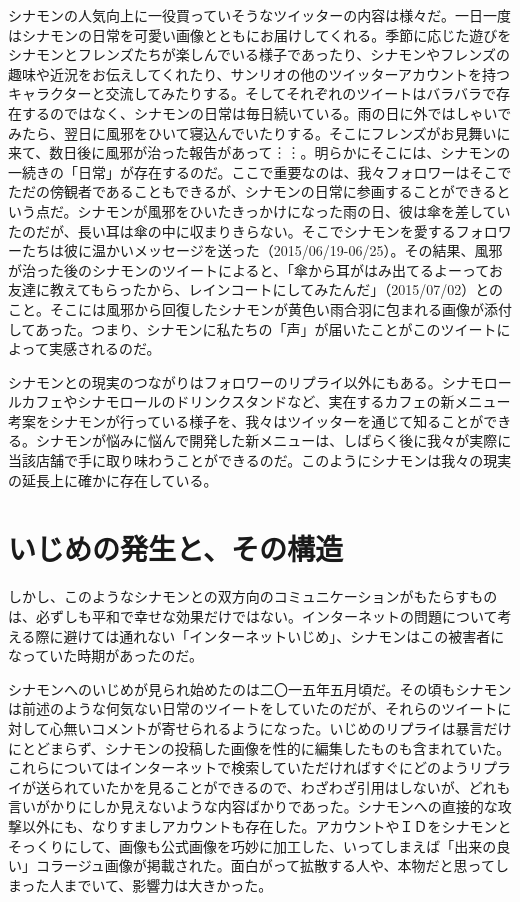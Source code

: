 \documentclass[b5j,twoside,twocolumn]{utarticle}
\begin{document}
シナモンの人気向上に一役買っていそうなツイッターの内容は様々だ。一日一度はシナモンの日常を可愛い画像とともにお届けしてくれる。季節に応じた遊びをシナモンとフレンズたちが楽しんでいる様子であったり、シナモンやフレンズの趣味や近況をお伝えしてくれたり、サンリオの他のツイッターアカウントを持つキャラクターと交流してみたりする。そしてそれぞれのツイートはバラバラで存在するのではなく、シナモンの日常は毎日続いている。雨の日に外ではしゃいでみたら、翌日に風邪をひいて寝込んでいたりする。そこにフレンズがお見舞いに来て、数日後に風邪が治った報告があって︙︙。明らかにそこには、シナモンの一続きの「日常」が存在するのだ。ここで重要なのは、我々フォロワーはそこでただの傍観者であることもできるが、シナモンの日常に参画することができるという点だ。シナモンが風邪をひいたきっかけになった雨の日、彼は傘を差していたのだが、長い耳は傘の中に収まりきらない。そこでシナモンを愛するフォロワーたちは彼に温かいメッセージを送った（2015/06/19-06/25）。その結果、風邪が治った後のシナモンのツイートによると、「傘から耳がはみ出てるよーってお友達に教えてもらったから、レインコートにしてみたんだ」（2015/07/02）とのこと。そこには風邪から回復したシナモンが黄色い雨合羽に包まれる画像が添付してあった。つまり、シナモンに私たちの「声」が届いたことがこのツイートによって実感されるのだ。


シナモンとの現実のつながりはフォロワーのリプライ以外にもある。シナモロールカフェやシナモロールのドリンクスタンドなど、実在するカフェの新メニュー考案をシナモンが行っている様子を、我々はツイッターを通じて知ることができる。シナモンが悩みに悩んで開発した新メニューは、しばらく後に我々が実際に当該店舗で手に取り味わうことができるのだ。このようにシナモンは我々の現実の延長上に確かに存在している。


\section*{いじめの発生と、その構造}
しかし、このようなシナモンとの双方向のコミュニケーションがもたらすものは、必ずしも平和で幸せな効果だけではない。インターネットの問題について考える際に避けては通れない「インターネットいじめ」、シナモンはこの被害者になっていた時期があったのだ。


シナモンへのいじめが見られ始めたのは二〇一五年五月頃だ。その頃もシナモンは前述のような何気ない日常のツイートをしていたのだが、それらのツイートに対して心無いコメントが寄せられるようになった。いじめのリプライは暴言だけにとどまらず、シナモンの投稿した画像を性的に編集したものも含まれていた。これらについてはインターネットで検索していただければすぐにどのようリプライが送られていたかを見ることができるので、わざわざ引用はしないが、どれも言いがかりにしか見えないような内容ばかりであった。シナモンへの直接的な攻撃以外にも、なりすましアカウントも存在した。アカウントやＩＤをシナモンとそっくりにして、画像も公式画像を巧妙に加工した、いってしまえば「出来の良い」コラージュ画像が掲載された。面白がって拡散する人や、本物だと思ってしまった人までいて、影響力は大きかった。
\end{document}
